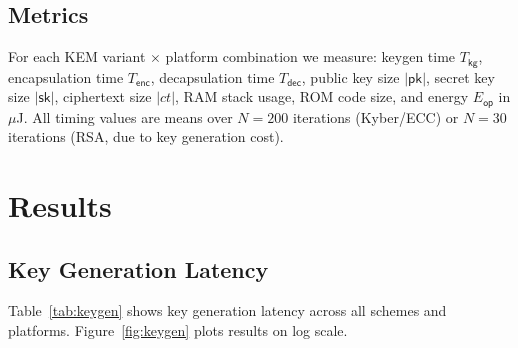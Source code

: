 \documentclass[10pt,journal,compsoc]{IEEEtran}
\begin{document}
\subsection{Metrics}

For each KEM variant $\times$ platform combination we measure:
keygen time $T_\mathsf{kg}$, encapsulation time $T_\mathsf{enc}$,
decapsulation time $T_\mathsf{dec}$, public key size $|\mathsf{pk}|$,
secret key size $|\mathsf{sk}|$, ciphertext size $|ct|$,
RAM stack usage, ROM code size, and energy $E_\mathsf{op}$ in
$\mu$J.
All timing values are means over $N=200$ iterations (Kyber/ECC)
or $N=30$ iterations (RSA, due to key generation cost).

\section{Results}
\label{sec:experiments}

\subsection{Key Generation Latency}

Table~\ref{tab:keygen} shows key generation latency across all schemes
and platforms. Figure~\ref{fig:keygen} plots results on log scale.

\begin{table}[h]
\centering
\caption{Key Generation / Encapsulation / Decapsulation Latency (ms)}
\label{tab:keygen}
\end{table}
\end{document}
